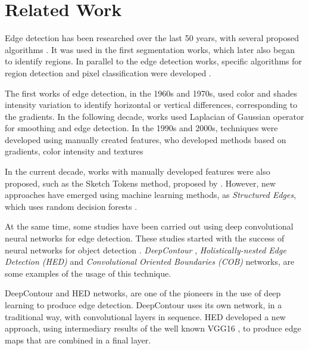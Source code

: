 \section{Related Work}
\label{cap4_trab_rel}

Edge detection has been researched over the last 50 years, with several proposed algorithms \cite{RCF:2017:8100105}. 
It was used in the first segmentation works, which later also began to identify regions.
In parallel to the edge detection works, specific algorithms for region detection and pixel classification were developed \cite{pedrini2008analise}.

The first works of edge detection, in the 1960s and 1970s, used color and shades intensity variation to identify horizontal or vertical differences, corresponding to the gradients.
In the following decade, works used Laplacian of Gaussian operator for smoothing and edge detection.
In the 1990s and 2000s, techniques were developed using manually created features, who developed methods based on gradients, color intensity and textures \cite{pedrini2008analise} %

In the current decade, works with manually developed features were also proposed, such as the Sketch Tokens method, proposed by \cite{LIM:6619250}. 
However, new approaches have emerged using machine learning methods, as \textit{Structured Edges}, which uses random decision forests \cite{StructuredEdges:2015}.

At the same time, some studies have been carried out using deep convolutional neural networks for edge detection. 
These studies started with the success of neural networks for object detection \cite{Segnet:2017:7803544}.
\textit{DeepContour} \cite{DeepContour:2015:7299024}, \textit{Holistically-nested Edge Detection (HED)} \cite{HED:2015} and \textit{Convolutional Oriented Boundaries (COB)} \cite{COB:2016} networks, are some examples of the usage of this technique.

DeepContour and HED networks, are one of the pioneers in the use of deep learning to produce edge detection.
DeepContour uses its own network, in a traditional way, with convolutional layers in sequence.
HED developed a new approach, using intermediary results of the well known VGG16 \cite{VGGNET:2014}, to produce edge maps that are combined in a final layer.

